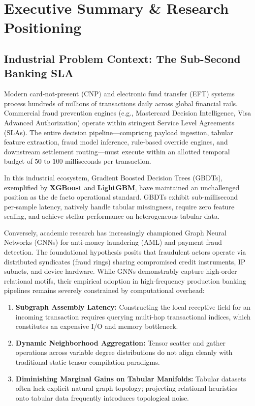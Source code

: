 \documentclass[11pt,a4paper]{article}
\begin{document}
\section{Executive Summary \& Research Positioning}

\subsection{Industrial Problem Context: The Sub-Second Banking SLA}
Modern card-not-present (CNP) and electronic fund transfer (EFT) systems process hundreds of millions of transactions daily across global financial rails. Commercial fraud prevention engines (e.g., Mastercard Decision Intelligence, Visa Advanced Authorization) operate within stringent Service Level Agreements (SLAs). The entire decision pipeline---comprising payload ingestion, tabular feature extraction, fraud model inference, rule-based override engines, and downstream settlement routing---must execute within an allotted temporal budget of $50$ to $100$ milliseconds per transaction. 

In this industrial ecosystem, Gradient Boosted Decision Trees (GBDTs), exemplified by \textbf{XGBoost} \cite{chen2016xgboost} and \textbf{LightGBM}, have maintained an unchallenged position as the de facto operational standard. GBDTs exhibit sub-millisecond per-sample latency, natively handle tabular missingness, require zero feature scaling, and achieve stellar performance on heterogeneous tabular data.

Conversely, academic research has increasingly championed Graph Neural Networks (GNNs) \cite{hamilton2017inductive,wang2019semi} for anti-money laundering (AML) and payment fraud detection. The foundational hypothesis posits that fraudulent actors operate via distributed syndicates (fraud rings) sharing compromised credit instruments, IP subnets, and device hardware. While GNNs demonstrably capture high-order relational motifs, their empirical adoption in high-frequency production banking pipelines remains severely constrained by computational overhead:
\begin{enumerate}[leftmargin=*]
    \item \textbf{Subgraph Assembly Latency:} Constructing the local receptive field for an incoming transaction requires querying multi-hop transactional indices, which constitutes an expensive I/O and memory bottleneck.
    \item \textbf{Dynamic Neighborhood Aggregation:} Tensor scatter and gather operations across variable degree distributions do not align cleanly with traditional static tensor compilation paradigms.
    \item \textbf{Diminishing Marginal Gains on Tabular Manifolds:} Tabular datasets often lack explicit natural graph topology; projecting relational heuristics onto tabular data frequently introduces topological noise.
\end{enumerate}
\end{document}
